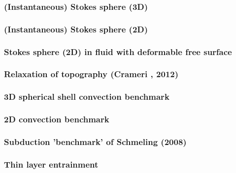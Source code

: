 \newpage
\subsubsection{(Instantaneous) Stokes sphere (3D)} \label{ss:stokes_sphere3D}


\newpage
\subsubsection{(Instantaneous) Stokes sphere (2D)} \label{ss:stokes_sphere2D}


\newpage
\subsubsection{Stokes sphere (2D) in fluid with deformable free surface} \label{ss:stokes_sphere_fs2D}


\subsubsection{Relaxation of topography (Crameri \etal, 2012)} \label{ss:crsg12}


\subsubsection{3D spherical shell convection benchmark} \label{ss:sscb3D}


\subsubsection{2D convection benchmark} \label{ss:blbc89}


\subsubsection{Subduction 'benchmark' of Schmeling \etal (2008)}


\subsubsection{Thin layer entrainment} \label{sec:tlentr}

